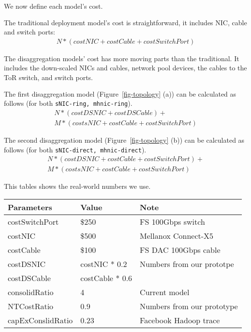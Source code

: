We now define each model's cost.

The traditional deployment model's cost is straightforward, it includes NIC, cable and switch ports:
\begin{gather}
N * (costNIC + costCable + costSwitchPort)
\end{gather}

The disaggregation models' cost has more moving parts than the traditional. It includes the down-scaled NICs and cables, network pool devices, the cables to the ToR switch, and switch ports.

The first disaggregation model (Figure~\ref{fig-topology} (a)) can be calculated as follows (for both \texttt{sNIC-ring, mhnic-ring}). 
\begin{align}
N * (costDSNIC + costDSCable) + \\
M * (costsNIC + costCable + costSwitchPort)
\end{align}

The second disaggregation model (Figure~\ref{fig-topology} (b)) can be calculated as follows (for both \texttt{sNIC-direct, mhnic-direct}).
\begin{align}
N * (costDSNIC + costCable + costSwitchPort) + \\
M * (costsNIC + costCable + costSwitchPort)
\end{align}

This tables shows the real-world numbers we use.

\begin{center}
\scriptsize
\begin{tabular}{|l|l|l|} 
 \hline
 Parameters & Value & Note \\
 \hline\hline
 costSwitchPort & \$250 & FS 100Gbps switch~\cite{fs-64port-switch} \\
 costNIC & \$500 & Mellanox Connect-X5 \\
 costCable & \$100 & FS DAC 100Gbps cable \\
 costDSNIC & costNIC * 0.2 & Numbers from our prototpe \\
 costDSCable & costCable * 0.6 & ~\cite{RAIL-NSDI} \\
 consolidRatio & 4 & Current model\\
 NTCostRatio & 0.9 & Numbers from our prototype \\
 capExConslidRatio & 0.23 & Facebook Hadoop trace~\cite{facebook-sigcomm15} \\
 \hline
\end{tabular}
\end{center}

